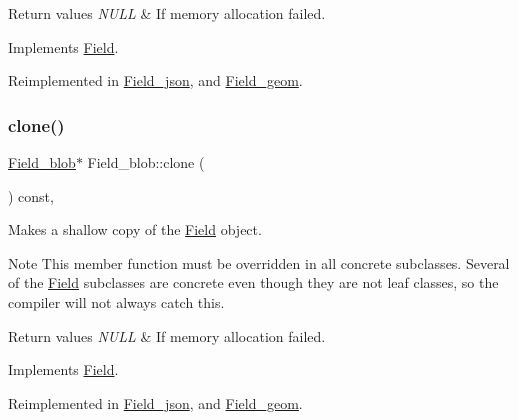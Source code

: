 \begin{DoxyRetVals}{Return values}
{\em N\+U\+LL} & If memory allocation failed. \\
\hline
\end{DoxyRetVals}


Implements \mbox{\hyperlink{classField_a64979bcb9345803b031fff76a0c3d9fe}{Field}}.



Reimplemented in \mbox{\hyperlink{classField__json_a11344951b6e0e08fd89726b23b0c8426}{Field\+\_\+json}}, and \mbox{\hyperlink{classField__geom_a79a6e5a31b39dbaddfef43ede4d82d40}{Field\+\_\+geom}}.

\mbox{\label{classField__blob_a075469b9df8583c1dc4968a983577886}} 
\subsubsection{\texorpdfstring{clone()}{clone()}\hspace{0.1cm}{\footnotesize\ttfamily [2/2]}}
{\footnotesize\ttfamily \mbox{\hyperlink{classField__blob}{Field\+\_\+blob}}$\ast$ Field\+\_\+blob\+::clone (\begin{DoxyParamCaption}{ }\end{DoxyParamCaption}) const\hspace{0.3cm}{\ttfamily [inline]}, {\ttfamily [virtual]}}

Makes a shallow copy of the \mbox{\hyperlink{classField}{Field}} object.

\begin{DoxyNote}{Note}
This member function must be overridden in all concrete subclasses. Several of the \mbox{\hyperlink{classField}{Field}} subclasses are concrete even though they are not leaf classes, so the compiler will not always catch this.
\end{DoxyNote}

\begin{DoxyRetVals}{Return values}
{\em N\+U\+LL} & If memory allocation failed. \\
\hline
\end{DoxyRetVals}


Implements \mbox{\hyperlink{classField_a01a9a9aa3a618941e839b1b8793c969d}{Field}}.



Reimplemented in \mbox{\hyperlink{classField__json_a5a39dbb204102637da9435f0fc380b52}{Field\+\_\+json}}, and \mbox{\hyperlink{classField__geom_ae0cdd2368852aafe6b325756ba3b5a24}{Field\+\_\+geom}}.

